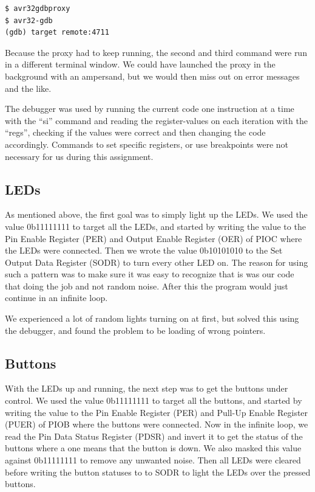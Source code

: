 \begin{verbatim}
$ avr32gdbproxy
$ avr32-gdb
(gdb) target remote:4711
\end{verbatim}

Because the proxy had to keep running, the second and third command were run in a different terminal window. We could have launched the proxy in the background with an ampersand, but we would then miss out on error messages and the like. 

The debugger was used by running the current code one instruction at a time with the “si” command and reading the register-values on each iteration with the “regs”, checking if the values were correct and then changing the code accordingly. Commands to set specific registers, or use breakpoints were not necessary for us during this assignment.
\subsection{LEDs}

As mentioned above, the first goal was to simply light up the LEDs. We used the value 0b11111111 to target all the LEDs, and started by writing the value to the Pin Enable Register (PER) and Output Enable Register (OER) of PIOC where the LEDs were connected. Then we wrote the value 0b10101010 to the Set Output Data Register (SODR) to turn every other LED on. The reason for using such a pattern was to make sure it was easy to recognize that is was our code that doing the job and not random noise. After this the program would just continue in an infinite loop.

We experienced a lot of random lights turning on at first, but solved this using the debugger, and found the problem to be loading of wrong pointers.
\subsection{Buttons}

With the LEDs up and running, the next step was to get the buttons under control. We used the value 0b11111111 to target all the buttons, and started by writing the value to the Pin Enable Register (PER) and Pull-Up Enable Register (PUER) of PIOB where the buttons were connected. Now in the infinite loop, we read the Pin Data Status Register (PDSR) and invert it to get the status of the buttons where a one means that the button is down. We also masked this value against 0b11111111 to remove any unwanted noise. Then all LEDs were cleared before writing the button statuses to to SODR to light the LEDs over the pressed buttons.

